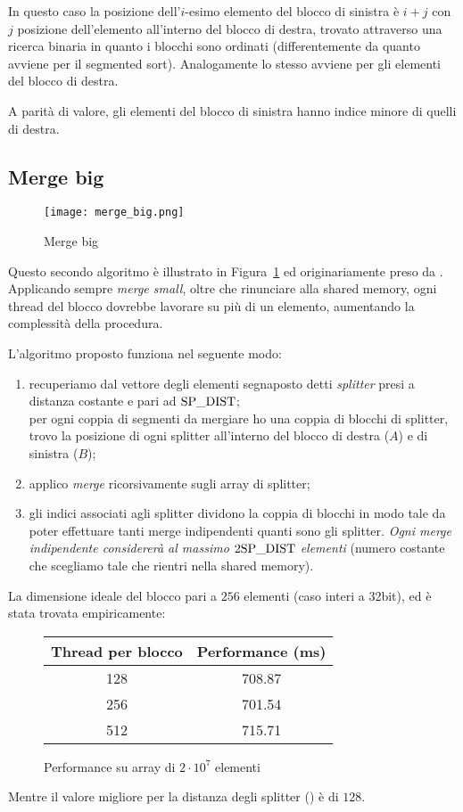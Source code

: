 In questo caso la posizione dell'$i$-esimo elemento del blocco di sinistra è $i+j$ con $j$ posizione dell'elemento all'interno del blocco di destra, trovato attraverso una ricerca binaria in quanto i blocchi sono ordinati (differentemente da quanto avviene per il segmented sort). Analogamente lo stesso avviene per gli elementi del blocco di destra. 

A parità di valore, gli elementi del blocco di sinistra hanno indice minore di quelli di destra. 

\subsection{Merge big}

\begin{figure}[t]
    \centering
	\texttt{[image: merge\_big.png]}
	\caption{Merge big}
	\label{merge_big}
\end{figure}

Questo secondo algoritmo è illustrato in Figura~\ref{merge_big} ed originariamente preso da \cite{mergebig}. Applicando sempre \emph{merge small}, oltre che rinunciare alla shared memory, ogni thread del blocco dovrebbe lavorare su più di un elemento, aumentando la complessità della procedura. 

L'algoritmo proposto funziona nel seguente modo:
\begin{enumerate}
    \item recuperiamo dal vettore degli elementi segnaposto detti \emph{splitter} presi a distanza costante e pari ad $\textrm{SP\_DIST}$; \\
    per ogni coppia di segmenti da mergiare ho una coppia di blocchi di splitter, trovo la posizione di ogni splitter all'interno del blocco di destra ($A$) e di sinistra ($B$);
    \item applico \emph{merge} ricorsivamente sugli array di splitter;
    \item gli indici associati agli splitter dividono la coppia di blocchi in modo tale da poter effettuare tanti merge indipendenti quanti sono gli splitter. \emph{Ogni merge indipendente considererà al massimo $2\textrm{SP\_DIST}$ elementi} (numero costante che scegliamo tale che rientri nella shared memory).
\end{enumerate}

La dimensione ideale del blocco pari a $256$ elementi (caso interi a 32bit), ed è stata trovata empiricamente:
\begin{figure}[H]
	\centering
	\begin{tabular}{SS}
		\toprule
		\textbf{Thread per blocco} & \textbf{Performance (\si{\milli\second})} \\   & 708.87  \\	
		256  & 701.54 \\
		512  & 715.71 \\ \bottomrule
	\end{tabular}
	\caption{Performance su array di $2\cdot 10^7$ elementi}
\end{figure}
Mentre il valore migliore per la distanza degli splitter (\SplitterDistance) è di $ 128 $.


